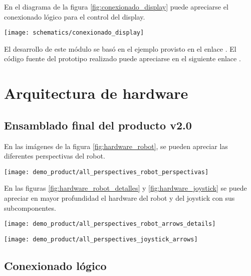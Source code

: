 En el diagrama de la figura \ref{fig:conexionado_display} puede apreciarse el conexionado lógico para el control del display.

\begin{center}
\texttt{[image: schematics/conexionado\_display]}
  \label{fig:conexionado_display}

\end{center}



El desarrollo de este módulo se basó en el ejemplo provisto en el enlace \cite{ESP32_Display_Example}. El código fuente del prototipo realizado puede apreciarse en el siguiente enlace \cite{ESP32_POC_display}.


\section{Arquitectura de hardware}


\subsection{Ensamblado final del producto v2.0}

En las imágenes de la figura \ref{fig:hardware_robot}, se pueden apreciar las diferentes perspectivas del robot.

\begin{center}
\texttt{[image: demo\_product/all\_perspectives\_robot\_perspectivas]}
  \label{fig:hardware_robot}
\end{center}


En las figuras \ref{fig:hardware_robot_detalles} y \ref{fig:hardware_joystick} se puede apreciar en mayor profundidad el hardware del robot y del joystick con sus subcomponentes.

\begin{center}
\texttt{[image: demo\_product/all\_perspectives\_robot\_arrows\_details]}
  \label{fig:hardware_robot_detalles}
\end{center}

\begin{center}
\texttt{[image: demo\_product/all\_perspectives\_joystick\_arrows]}
  \label{fig:hardware_joystick}
\end{center}


\subsection{Conexionado lógico }

